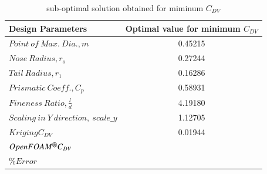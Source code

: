 \begin{table}[H]
	\centering
	\caption{sub-optimal solution obtained for miminum $ C_{DV} $}
	\label{sub-optimal solution obtained}
	\begin{tabular}{lc}
		\hline \hline
		Design Parameters & Optimal value for minimum $ C_{DV} $    \\ \hline \hline
		
		$ Point\ of\ Max.\ Dia., m$ & 0.45215      \\  
		$ Nose\ Radius, r _{o} $ & 0.27244    \\
		$ Tail\ Radius, r _{1} $ & 0.16286     \\  
		$ Prismatic\ Coeff., C _{p }$ & 0.58931 \\
		$ Fineness\ Ratio, \frac{l}{d} $ &4.19180 \\
		$Scaling\ in\ Y\ direction,\ scale\_y$ & 1.12705 \\ \hline \hline
		
		$ Kriging C_{DV} $ &0.01944 \\
		$ OpenFOAM\textsuperscript{\textregistered} C_{DV} $ & \\ \hline
		$ \% Error $ &  \\
		\hline \hline
	\end{tabular}
\end{table}

